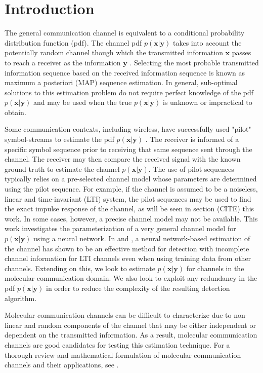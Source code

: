\section{Introduction}

The general communication channel is equivalent to a conditional probability distribution function (pdf). The channel pdf $p(\mathbf{x}|\mathbf{y})$ takes into account the potentially random channel though which the transmitted information $\mathbf{x}$ passes to reach a receiver as the information $\mathbf{y}$ \cite[Ch.~7]{cover2012elements}. Selecting the most probable transmitted information sequence based on the received information sequence is known as maximum a posteriori (MAP) sequence estimation. In general, sub-optimal solutions to this estimation problem do not require perfect knowledge of the pdf $p(\mathbf{x}|\mathbf{y})$ and may be used when the true $p(\mathbf{x}|\mathbf{y})$ is unknown or impractical to obtain.

\par
Some communication contexts, including wireless, have successfully used "pilot" symbol-streams to estimate the pdf $p(\mathbf{x}|\mathbf{y})$ \cite{van1995channel}. The receiver is informed of a specific symbol sequence prior to receiving that same sequence sent through the channel. The receiver may then compare the received signal with the known ground truth to estimate the channel $p(\mathbf{x}|\mathbf{y})$.
The use of pilot sequences typically relies on a pre-selected channel model whose parameters are determined using the pilot sequence. For example, if the channel is assumed to be a noiseless, linear and time-invariant (LTI) system, the pilot sequences may be used to find the exact impulse response of the channel, as will be seen in section (CITE) this work. In some cases, however, a precise channel model may not be available. This work investigates the parameterization of a very general channel model for $p(\mathbf{x}|\mathbf{y})$ using a neural network. In \cite{shlezinger2019viterbinet} and \cite{shlezinger2020datadriven}, a neural network-based estimation of the channel has shown to be an effective method for detection with incomplete channel information for LTI channels even when using training data from other channels.
 Extending on this, we look to estimate $p(\mathbf{x}|\mathbf{y})$ for channels in the molecular communication domain.
 We also look to exploit any redundancy in the pdf $p(\mathbf{x}|\mathbf{y})$ in order to reduce the complexity of the resulting detection algorithm.
\par
Molecular communication channels can be difficult to characterize due to non-linear and random components of the channel that may be either independent or dependent on the transmitted information. As a result, molecular communication channels are good candidates for testing this estimation technique. For a thorough review and mathematical formulation of molecular communication channels and their applications, see \cite{jamali2019channel}. 

